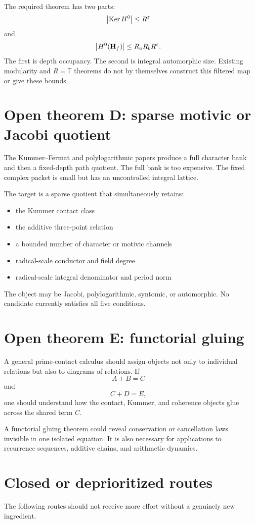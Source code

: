 The required theorem has two parts:
\[
\left|\operatorname{Ker} H^0\right|\le R^\varepsilon
\]
and
\[
\left|H^0(\mathbf H_f)\right|\le R_aR_bR^\varepsilon.
\]
The first is depth occupancy. The second is integral automorphic size. Existing modularity and $R=\mathbb T$ theorems do not by themselves construct this filtered map or give these bounds.

\section{Open theorem D: sparse motivic or Jacobi quotient}
The Kummer--Fermat and polylogarithmic papers produce a full character bank and then a fixed-depth path quotient. The full bank is too expensive. The fixed complex packet is small but has an uncontrolled integral lattice.

The target is a sparse quotient that simultaneously retains:
\begin{itemize}[leftmargin=1.5em]
\item the Kummer contact class
\item the additive three-point relation
\item a bounded number of character or motivic channels
\item radical-scale conductor and field degree
\item radical-scale integral denominator and period norm
\end{itemize}

The object may be Jacobi, polylogarithmic, syntomic, or automorphic. No candidate currently satisfies all five conditions.

\section{Open theorem E: functorial gluing}
A general prime-contact calculus should assign objects not only to individual relations but also to diagrams of relations. If
\[
A+B=C
\]
and
\[
C+D=E,
\]
one should understand how the contact, Kummer, and coherence objects glue across the shared term $C$.

A functorial gluing theorem could reveal conservation or cancellation laws invisible in one isolated equation. It is also necessary for applications to recurrence sequences, additive chains, and arithmetic dynamics.

\section{Closed or deprioritized routes}
The following routes should not receive more effort without a genuinely new ingredient.

